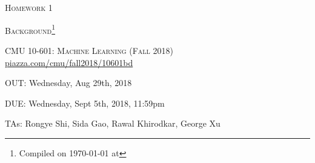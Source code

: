\documentclass[12pt]{article}
\begin{document}
\section*{}
\begin{center}
  \centerline{\textsc{\LARGE  Homework 1}}
  \vspace{0.5em}
  \centerline{\textsc{\LARGE Background}\footnote{Compiled on \today{} at \currenttime{}}}
  \vspace{1em}
  \textsc{\large CMU 10-601: Machine Learning (Fall 2018)} \\
  \vspace{0.5em}
  \url{piazza.com/cmu/fall2018/10601bd} \\
  \vspace{0.5em}
  \centerline{OUT: Wednesday, Aug 29th, 2018}
  \vspace{0.5em}
  \centerline{DUE: Wednesday, Sept 5th, 2018, 11:59pm}
    \centerline{TAs: Rongye Shi, Sida Gao, Rawal Khirodkar, George Xu}
\end{center}
\end{document}
